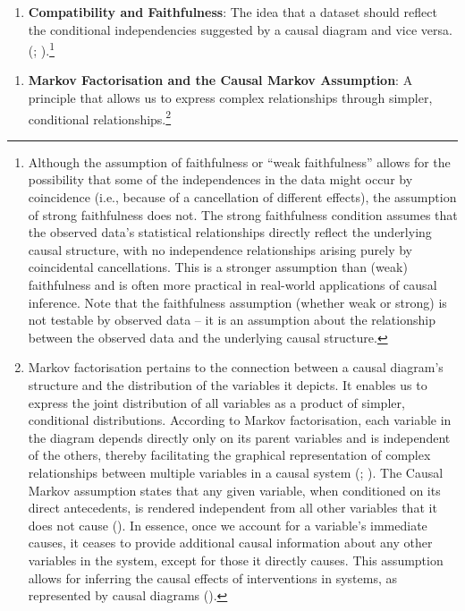 \documentclass[
  singlecolumn,
  9pt]{article}
\providecommand{\tightlist}{%
  \setlength{\itemsep}{0pt}\setlength{\parskip}{0pt}}\usepackage{longtable,booktabs,array}
\begin{document}
\begin{enumerate}
\def\labelenumi{\arabic{enumi}.}
\setcounter{enumi}{8}
\tightlist
\item
  \textbf{Compatibility and Faithfulness}: The idea that a dataset
  should reflect the conditional independencies suggested by a causal
  diagram and vice
  versa.(;
  ).\footnote{Although
    the assumption of faithfulness or ``weak faithfulness'' allows for
    the possibility that some of the independences in the data might
    occur by coincidence (i.e., because of a cancellation of different
    effects), the assumption of strong faithfulness does not. The strong
    faithfulness condition assumes that the observed data's statistical
    relationships directly reflect the underlying causal structure, with
    no independence relationships arising purely by coincidental
    cancellations. This is a stronger assumption than (weak)
    faithfulness and is often more practical in real-world applications
    of causal inference. Note that the faithfulness assumption (whether
    weak or strong) is not testable by observed data -- it is an
    assumption about the relationship between the observed data and the
    underlying causal structure.}
\end{enumerate}

\begin{enumerate}
\def\labelenumi{\arabic{enumi}.}
\setcounter{enumi}{9}
\tightlist
\item
  \textbf{Markov Factorisation and the Causal Markov Assumption}: A
  principle that allows us to express complex relationships through
  simpler, conditional relationships.\footnote{Markov factorisation
    pertains to the connection between a causal diagram's structure and
    the distribution of the variables it depicts. It enables us to
    express the joint distribution of all variables as a product of
    simpler, conditional distributions. According to Markov
    factorisation, each variable in the diagram depends directly only on
    its parent variables and is independent of the others, thereby
    facilitating the graphical representation of complex relationships
    between multiple variables in a causal system
    (;
    ). The Causal Markov
    assumption states that any given variable, when conditioned on its
    direct antecedents, is rendered independent from all other variables
    that it does not cause (). In essence, once we account for a variable's immediate
    causes, it ceases to provide additional causal information about any
    other variables in the system, except for those it directly causes.
    This assumption allows for inferring the causal effects of
    interventions in systems, as represented by causal diagrams
    ().}
\end{enumerate}
\end{document}
